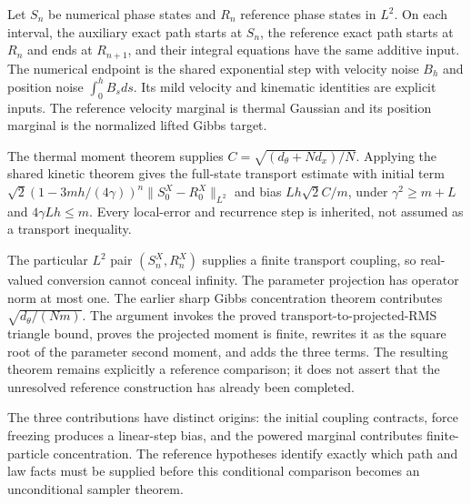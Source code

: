 \documentclass[11pt,a4paper]{report}
\begin{document}
Let \(S_n\) be numerical phase states and \(R_n\) reference phase states in \(L^{2}\). On each interval, the auxiliary exact path starts at \(S_n\), the reference exact path starts at \(R_n\) and ends at \(R_{n+1}\), and their integral equations have the same additive input. The numerical endpoint is the shared exponential step with velocity noise \(B_h\) and position noise \(\int_0^hB_sds\). Its mild velocity and kinematic identities are explicit inputs. The reference velocity marginal is thermal Gaussian and its position marginal is the normalized lifted Gibbs target.



The thermal moment theorem supplies \(C=\sqrt{(d_\theta+Nd_x)/N}\). Applying the shared kinetic theorem gives the full-state transport estimate with initial term \(\sqrt2(1-3mh/(4\gamma))^n\|S_0^X-R_0^X\|_{L^2}\) and bias \(Lh\sqrt2C/m\), under \(\gamma^2\ge m+L\) and \(4\gamma Lh\le m\). Every local-error and recurrence step is inherited, not assumed as a transport inequality.



The particular \(L^{2}\) pair \((S_n^X,R_n^X)\) supplies a finite transport coupling, so real-valued conversion cannot conceal infinity. The parameter projection has operator norm at most one. The earlier sharp Gibbs concentration theorem contributes \(\sqrt{d_\theta/(Nm)}\). The argument invokes the proved transport-to-projected-RMS triangle bound, proves the projected moment is finite, rewrites it as the square root of the parameter second moment, and adds the three terms. The resulting theorem remains explicitly a reference comparison; it does not assert that the unresolved reference construction has already been completed.



The three contributions have distinct origins: the initial coupling contracts, force freezing produces a linear-step bias, and the powered marginal contributes finite-particle concentration. The reference hypotheses identify exactly which path and law facts must be supplied before this conditional comparison becomes an unconditional sampler theorem.
\end{document}
